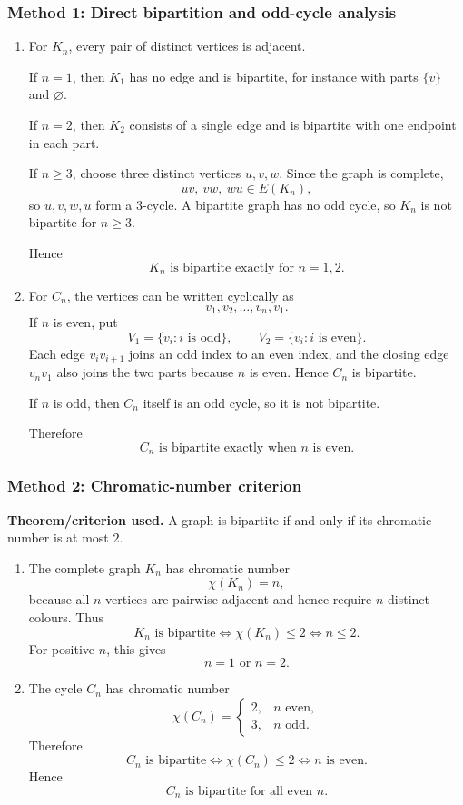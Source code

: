 \documentclass[12pt]{article}
\begin{document}
\subsubsection{Method 1: Direct bipartition and odd-cycle analysis}
\begin{enumerate}[label=(\alph*)]
  \item For $K_n$, every pair of distinct vertices is adjacent.

  If $n=1$, then $K_1$ has no edge and is bipartite, for instance with parts $\{v\}$ and $\varnothing$.

  If $n=2$, then $K_2$ consists of a single edge and is bipartite with one endpoint in each part.

  If $n\ge 3$, choose three distinct vertices $u,v,w$. Since the graph is complete,
  \[
  uv,\ vw,\ wu\in E(K_n),
  \]
  so $u,v,w,u$ form a $3$-cycle. A bipartite graph has no odd cycle, so $K_n$ is not bipartite for $n\ge 3$.

  Hence
  \[
  \boxed{K_n\text{ is bipartite exactly for }n=1,2.}
  \]

  \item For $C_n$, the vertices can be written cyclically as
  \[
  v_1,v_2,\dots,v_n,v_1.
  \]
  If $n$ is even, put
  \[
  V_1=\{v_i:i\text{ is odd}\},\qquad V_2=\{v_i:i\text{ is even}\}.
  \]
  Each edge $v_iv_{i+1}$ joins an odd index to an even index, and the closing edge $v_nv_1$ also joins the two parts because $n$ is even. Hence $C_n$ is bipartite.

  If $n$ is odd, then $C_n$ itself is an odd cycle, so it is not bipartite.

  Therefore
  \[
  \boxed{C_n\text{ is bipartite exactly when }n\text{ is even}.}
  \]
\end{enumerate}

\subsubsection{Method 2: Chromatic-number criterion}
\textbf{Theorem/criterion used.} A graph is bipartite if and only if its chromatic number is at most $2$.

\begin{enumerate}[label=(\alph*)]
  \item The complete graph $K_n$ has chromatic number
  \[
  \chi(K_n)=n,
  \]
  because all $n$ vertices are pairwise adjacent and hence require $n$ distinct colours. Thus
  \[
  K_n\text{ is bipartite}
  \iff \chi(K_n)\le 2
  \iff n\le 2.
  \]
  For positive $n$, this gives
  \[
  \boxed{n=1\text{ or }n=2.}
  \]

  \item The cycle $C_n$ has chromatic number
  \[
  \chi(C_n)=
  \begin{cases}
  2, & n\text{ even},\\
  3, & n\text{ odd}.
  \end{cases}
  \]
  Therefore
  \[
  C_n\text{ is bipartite}
  \iff \chi(C_n)\le 2
  \iff n\text{ is even}.
  \]
  Hence
  \[
  \boxed{C_n\text{ is bipartite for all even }n.}
  \]
\end{enumerate}
\end{document}
